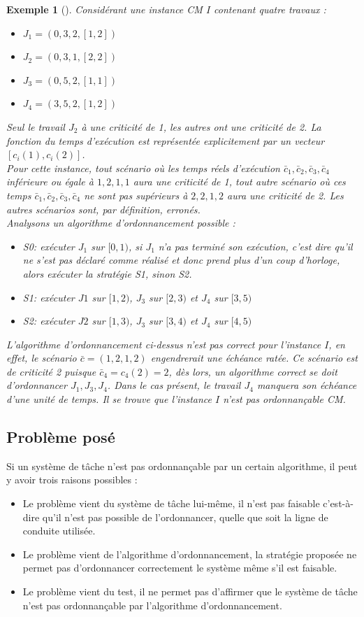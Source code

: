 \documentclass[a4paper]{report}
\theoremstyle{break}
\newtheorem{exem}{Exemple}
\begin{document}
\begin{exem}[\cite{baruah2010towards}]
Considérant une instance CM $I$ contenant quatre travaux :
\begin{itemize}
\item $J_1 = (0,3,2,[1,2])$
\item $J_2 = (0,3,1,[2,2])$
\item $J_3 = (0,5,2,[1,1])$
\item $J_4 = (3,5,2,[1,2])$
\end{itemize}
Seul le travail $J_2$ à une criticité de 1, les autres ont une criticité de 2. La fonction du temps d'exécution est représentée explicitement par un vecteur $[c_i(1), c_i(2)]$.\\
Pour cette instance, tout scénario où les temps réels d'exécution $\bar{c}_1,\bar{c}_2,\bar{c}_3,\bar{c}_4$ inférieure ou égale à $1,2,1,1$ aura une criticité de 1, tout autre scénario où ces temps $\bar{c}_1,\bar{c}_2,\bar{c}_3,\bar{c}_4$ ne sont pas supérieurs à $ 2,2,1,2$ aura une criticité de 2. Les autres scénarios sont, par définition, erronés.\\
Analysons un algorithme d'ordonnancement possible :
\begin{itemize}
\item S0: exécuter $J_1$ sur $[0,1)$, si $J_1$ n'a pas terminé son exécution, c'est dire qu'il ne s'est pas déclaré comme réalisé et donc prend plus d’un coup d'horloge, alors exécuter la stratégie S1, sinon S2.
\item S1: exécuter $J1$ sur $[1,2)$, $J_3$ sur $[2,3)$ et $J_4$ sur $[3,5)$
\item S2: exécuter $J2$ sur $[1,3)$, $J_3$ sur $[3,4)$ et $J_4$ sur $[4,5)$
\end{itemize}
L'algorithme d'ordonnancement ci-dessus n'est pas correct pour l'instance $I$, en effet, le scénario $\bar{c} = (1,2,1,2)$ engendrerait une échéance ratée. Ce scénario est de criticité 2 puisque $\bar{c}_4 = c_4(2) = 2$, dès lors, un algorithme correct se doit d'ordonnancer $J_1, J_3, J_4$. Dans le cas présent, le travail $J_4$ manquera son échéance d'une unité de temps. Il se trouve que l'instance $I$ n'est pas ordonnançable CM.
\end{exem}
\subsection{Problème posé}
Si un système de tâche n'est pas ordonnançable par un certain algorithme, il peut y avoir trois raisons possibles \cite{bakerbrute} :
\begin{itemize}
\item Le problème vient du système de tâche lui-même, il n'est pas faisable c'est-à-dire qu'il n'est pas possible de l'ordonnancer, quelle que soit la ligne de conduite utilisée.
\item Le problème vient de l'algorithme d'ordonnancement, la stratégie proposée ne permet pas d'ordonnancer correctement le système même s'il est faisable.
\item Le problème vient du test, il ne permet pas d'affirmer que le système de tâche n'est pas ordonnançable par l'algorithme d'ordonnancement.
\end{itemize}
\end{document}
